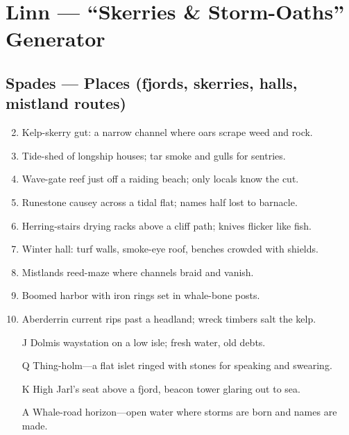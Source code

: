\chapter{Linn --- ``Skerries \& Storm-Oaths'' Generator}
\label{chap:linn}

\section*{Spades --- Places (fjords, skerries, halls, mistland routes)}
\label{sec:linn-places}
\begin{enumerate}
\setcounter{enumi}{1}
\item Kelp-skerry gut: a narrow channel where oars scrape weed and rock.
\item Tide-shed of longship houses; tar smoke and gulls for sentries.
\item Wave-gate reef just off a raiding beach; only locals know the cut.
\item Runestone causey across a tidal flat; names half lost to barnacle.
\item Herring-stairs drying racks above a cliff path; knives flicker like fish.
\item Winter hall: turf walls, smoke-eye roof, benches crowded with shields.
\item Mistlands reed-maze where channels braid and vanish.
\item Boomed harbor with iron rings set in whale-bone posts.
\item Aberderrin current rips past a headland; wreck timbers salt the kelp.
\item[J] Dolmis waystation on a low isle; fresh water, old debts.
\item[Q] Thing-holm---a flat islet ringed with stones for speaking and swearing.
\item[K] High Jarl's seat above a fjord, beacon tower glaring out to sea.
\item[A] Whale-road horizon---open water where storms are born and names are made.
\end{enumerate}


